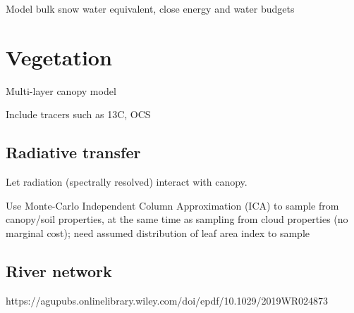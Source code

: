 \documentclass{article}
\begin{document}
Model bulk snow water equivalent, close energy and water budgets

\section{Vegetation}

Multi-layer canopy model

Include tracers such as 13C, OCS

\subsection{Radiative transfer}

Let radiation (spectrally resolved) interact with canopy.

Use Monte-Carlo Independent Column Approximation (ICA) to sample from canopy/soil properties, at the same time as sampling from cloud properties (no marginal cost); need assumed distribution of leaf area index to sample

\subsection{River network}
https://agupubs.onlinelibrary.wiley.com/doi/epdf/10.1029/2019WR024873



\end{document}
